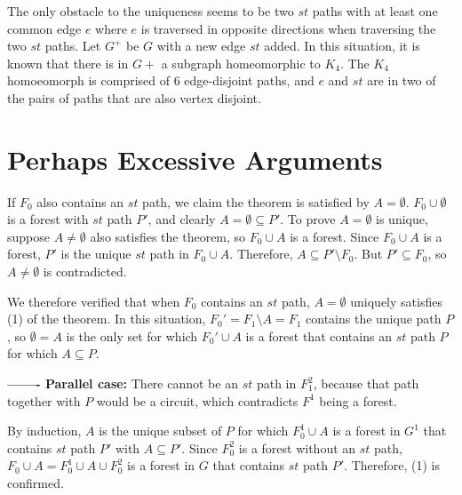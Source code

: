 \documentclass[12pt,leqno]{amsart}
\begin{document}
The only obstacle to the uniqueness seems to be 
two $st$ paths with at least one common edge
$e$ where $e$ is traversed in opposite directions
when traversing the two $st$ paths.  Let $G^+$ be $G$ with
a new edge $st$ added. In this situation,
it is known that there is in $G+$ a subgraph homeomorphic to $K_4$.
The $K_4$ homoeomorph is comprised of 6 edge-disjoint paths, and
$e$ and $st$ are in two of the pairs of paths that are 
also vertex disjoint.




\section{Perhaps Excessive Arguments}

If $F_0$ also contains an $st$ path, we claim the theorem is satisfied by
$A=\emptyset$.  $F_0\cup\emptyset$ is a forest with 
$st$ path $P'$, and clearly $A=\emptyset\subseteq P'$.  
To prove $A=\emptyset$ is unique, suppose $A\neq \emptyset$ 
also satisfies the theorem, so
$F_0\cup A$ is a forest.  Since $F_0\cup A$ is a forest, 
$P'$ is the unique $st$ path in $F_0\cup A$.  Therefore, 
$A\subseteq P'\setminus F_0$.  But $P'\subseteq F_0$, so
$A\neq\emptyset$ is contradicted.

We therefore verified that when $F_0$ contains an $st$ path,
$A=\emptyset$ uniquely satisfies (1) of the theorem.
In this situation, $F_0'=F_1\setminus A=F_1$ contains the 
unique path $P$, so $\emptyset=A$ is the only set for 
which $F_0'\cup A$ is a forest that contains an $st$ path $P$
for which $A\subseteq P$.



{\bf ------- Parallel case:}
There cannot be an $st$ path in $F_1^2$, because
that path together with $P$ would be a circuit, which
contradicts $F^1$ being a forest.

By induction, $A$ is the unique subset of $P$ for which
$F_0^1\cup A$ is a forest in $G^1$ that 
contains $st$ path $P'$ with $A\subseteq P'$. 
Since $F_0^2$ is a forest without an $st$ path,
$F_0\cup A=F_0^1\cup A\cup F_0^2$ is a forest 
in $G$ that contains $st$ path $P'$.  Therefore, (1) is confirmed.
\end{document}
